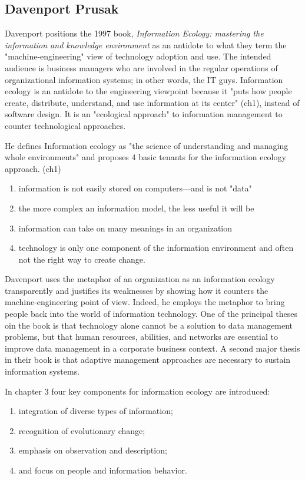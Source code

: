 \subsection{Davenport Prusak}

Davenport positions the 1997 book, \textit{Information Ecology: mastering the information and knowledge environment} as an antidote to what they term the "machine-engineering" view of technology adoption and use. The intended audience is business managers who are involved in the regular operations of organizational information systems; in other words, the IT guys. Information ecology is an antidote to the engineering viewpoint because it "puts how people create, distribute, understand, and use information at its center" (ch1), instead of software design. It is an "ecological approach" to information management to counter technological approaches.

He defines Information ecology as "the science of understanding and managing whole environments" and proposes 4 basic tenants for the information ecology approach. (ch1)
\begin{enumerate}
\item information is not easily stored on computers—and is not "data"
\item the more complex an information model, the less useful it will be
\item information can take on many meanings in an organization
\item technology is only one component of the information environment and often not the right way to create change.
\end{enumerate}

Davenport uses the metaphor of an organization as an information ecology transparently and justifies its weaknesses by showing how it counters the machine-engineering point of view. Indeed, he employs the metaphor to bring people back into the world of information technology. One of the principal theses oin the book is that technology alone cannot be a solution to data management problems, but that human resources, abilities, and networks are essential to improve data management in a corporate business context. A second major thesis in their book is that adaptive management approaches are necessary to sustain information systems.

In chapter 3 four key components for information ecology are introduced: 

\begin{enumerate}
\item integration of diverse types of information;
\item recognition of evolutionary change;
\item emphasis on observation and description;
\item and focus on people and information behavior.
\end{enumerate}

